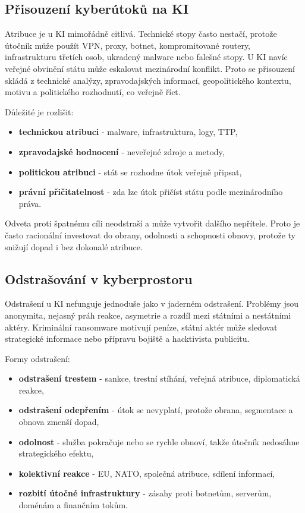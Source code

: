 \subsection*{Přisouzení kyberútoků na KI}
Atribuce je u KI mimořádně citlivá. Technické stopy často nestačí, protože útočník může použít VPN, proxy, botnet, kompromitované routery, infrastrukturu třetích osob, ukradený malware nebo falešné stopy. U KI navíc veřejné obvinění státu může eskalovat mezinárodní konflikt. Proto se přisouzení skládá z technické analýzy, zpravodajských informací, geopolitického kontextu, motivu a politického rozhodnutí, co veřejně říct.

Důležité je rozlišit:
\begin{itemize}
  \item \textbf{technickou atribuci} - malware, infrastruktura, logy, TTP,
  \item \textbf{zpravodajské hodnocení} - neveřejné zdroje a metody,
  \item \textbf{politickou atribuci} - stát se rozhodne útok veřejně připsat,
  \item \textbf{právní přičitatelnost} - zda lze útok přičíst státu podle mezinárodního práva.
\end{itemize}
Odveta proti špatnému cíli neodstraší a může vytvořit dalšího nepřítele. Proto je často racionální investovat do obrany, odolnosti a schopnosti obnovy, protože ty snižují dopad i bez dokonalé atribuce.

\subsection*{Odstrašování v kyberprostoru}
Odstrašení u KI nefunguje jednoduše jako v jaderném odstrašení. Problémy jsou anonymita, nejasný práh reakce, asymetrie a rozdíl mezi státními a nestátními aktéry. Kriminální ransomware motivují peníze, státní aktér může sledovat strategické informace nebo přípravu bojiště a hacktivista publicitu.

Formy odstrašení:
\begin{itemize}
  \item \textbf{odstrašení trestem} - sankce, trestní stíhání, veřejná atribuce, diplomatická reakce,
  \item \textbf{odstrašení odepřením} - útok se nevyplatí, protože obrana, segmentace a obnova zmenší dopad,
  \item \textbf{odolnost} - služba pokračuje nebo se rychle obnoví, takže útočník nedosáhne strategického efektu,
  \item \textbf{kolektivní reakce} - EU, NATO, společná atribuce, sdílení informací,
  \item \textbf{rozbití útočné infrastruktury} - zásahy proti botnetům, serverům, doménám a finančním tokům.
\end{itemize}

